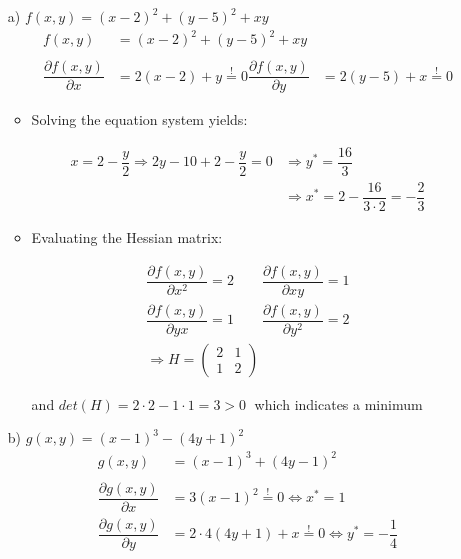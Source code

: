 \documentclass[12pt,a4paper]{article}
\begin{document}
\begin{itemize}
    \item[a)] $f(x,y) = (x -2)^2 + (y -5)^2 + xy$
    \begin{align*}
      f(x,y) & = (x -2)^2 + (y - 5)^2 + xy\\
      & \\
      \dfrac{\partial f(x,y)}{\partial x} & = 2(x -2) + y \overset{!}{=} 0
      \dfrac{\partial f(x,y)}{\partial y} & = 2(y -5) + x \overset{!}{=} 0 
    \end{align*}
    \begin{itemize}
      \item Solving the equation system yields:
    \end{itemize}
    \begin{align*}
      x = 2 -\dfrac{y}{2} \Rightarrow 2y - 10 + 2 - \dfrac{y}{2} = 0 &\Rightarrow y^{*} = \dfrac{16}{3} \\
      &\Rightarrow x^{*} = 2 -\dfrac{16}{3 \cdot 2} = - \dfrac{2}{3}
    \end{align*}
    \begin{itemize}
      \item Evaluating the Hessian matrix:
    \end{itemize}
    \begin{align*}
      \dfrac{\partial f(x,y)}{\partial x^2} = 2 \qquad  \dfrac{\partial f(x,y)}{\partial xy} = 1 \\
      \dfrac{\partial f(x,y)}{\partial yx} = 1  \qquad  \dfrac{\partial f(x,y)}{\partial y^2} = 2\\
      \Rightarrow H = 
      \begin{pmatrix}
        2 & 1 \\
        1 & 2
      \end{pmatrix}
    \end{align*}
    \begin{itemize}
      \item[] and $det(H) = 2 \cdot 2 - 1 \cdot 1 = 3 > 0 \;$ which indicates a minimum
    \end{itemize}
    \item[b)] $g(x,y) = (x -1)^3 - (4y + 1)^2$
    \begin{align*}
      g(x,y) & = (x -1)^3 + (4y - 1)^2\\
      & \\
      \dfrac{\partial g(x,y)}{\partial x} & = 3(x - 1)^2 \overset{!}{=} 0 \Leftrightarrow x^{*} = 1 \\
      \dfrac{\partial g(x,y)}{\partial y} & = 2 \cdot 4 (4y + 1) + x \overset{!}{=} 0 \Leftrightarrow y^{*} = - \dfrac{1}{4} 

\end{align*}
\end{itemize}
\end{document}
